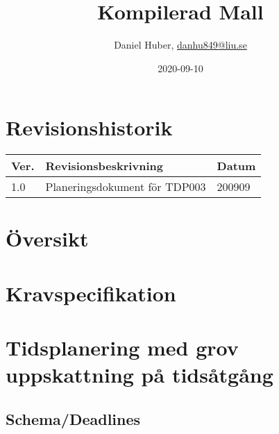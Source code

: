 \documentclass{TDP003mall}
\author{Daniel Huber, \url{danhu849@liu.se}}
\title{Kompilerad Mall}
\date{2020-09-10}
\begin{document}
\projectpage
\section{Revisionshistorik}
\begin{table}[!h]
\begin{tabularx}{\linewidth}{|l|X|l|}
\hline
Ver. & Revisionsbeskrivning & Datum \\\hline
1.0 & Planeringsdokument för TDP003 & 200909 \\\hline
\end{tabularx}
\end{table}


\section{Översikt}



\section{Kravspecifikation}

\section{Tidsplanering med grov uppskattning på tidsåtgång}


\subsection{Schema/Deadlines}
\end{document}
